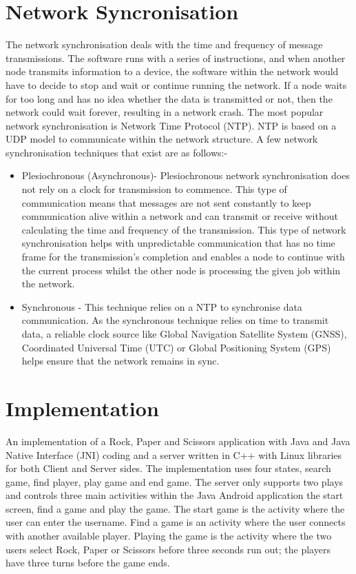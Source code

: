 \documentclass[conference]{IEEEtran}
\begin{document}
    \section{Network Syncronisation}
      The network synchronisation deals with the time and frequency of message transmissions. The software runs with a series of instructions, and when another node transmits information to a device, the software within the network would have to decide to stop and wait or continue running the network. If a node waits for too long and has no idea whether the data is transmitted or not, then the network could wait forever, resulting in a network crash. The most popular network synchronisation is Network Time Protocol (NTP). NTP is based on a UDP model to communicate within the network structure. A few network synchronisation techniques that exist are as follows:-
      \begin{itemize}
        \item Plesiochronous (Asynchronous)-
        Plesiochronous network synchronisation does not rely on a clock for transmission to commence. This type of communication means that messages are not sent constantly to keep communication alive within a network and can transmit or receive without calculating the time and frequency of the transmission. This type of network synchronisation helps with unpredictable communication that has no time frame for the transmission's completion and enables a node to continue with the current process whilst the other node is processing the given job within the network.
        
        \item Synchronous -
        This technique relies on a NTP to synchronise data communication. As the synchronous technique relies on time to transmit data, a reliable clock source like Global Navigation Satellite System (GNSS), Coordinated Universal Time (UTC) or Global Positioning System (GPS) helps ensure that the network remains in sync.
      \end{itemize}
    \section{Implementation}
      An implementation of a Rock, Paper and Scissors application with Java and Java Native Interface (JNI) coding and a server written in C++ with Linux libraries for both Client and Server sides. The implementation uses four states, search game, find player, play game and end game. The server only supports two plays and controls three main activities within the Java Android application the start screen, find a game and play the game. The start game is the activity where the user can enter the username. Find a game is an activity where the user connects with another available player. Playing the game is the activity where the two users select Rock, Paper or Scissors before three seconds run out; the players have three turns before the game ends.
\end{document}
